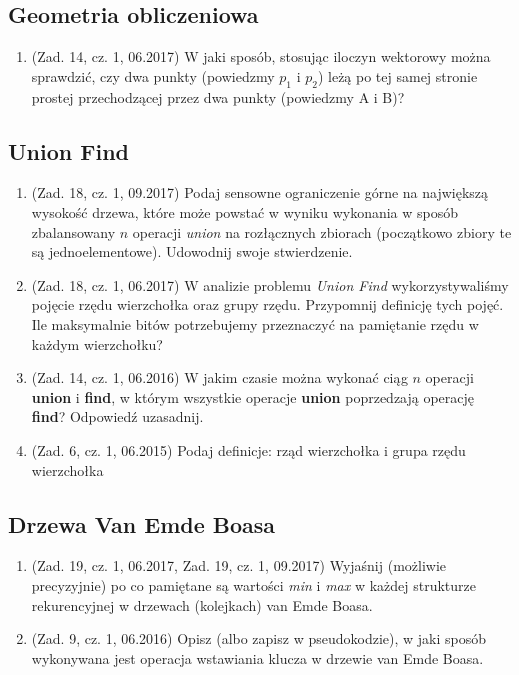 \documentclass[10pt]{article}%
\begin{document}
\subsection{Geometria obliczeniowa}

\begin{enumerate}

\item (Zad. 14, cz. 1, 06.2017) W jaki sposób, stosując iloczyn wektorowy można sprawdzić, czy dwa punkty (powiedzmy $p_1$ i $p_2$) leżą po tej samej stronie prostej przechodzącej przez dwa punkty (powiedzmy A i B)?

\end{enumerate}


\subsection{Union Find}

\begin{enumerate}

\item (Zad. 18, cz. 1, 09.2017) Podaj sensowne ograniczenie górne na największą wysokość drzewa, które może powstać w wyniku wykonania w sposób zbalansowany $n$ operacji \textit{union} na rozłącznych zbiorach (początkowo zbiory te są jednoelementowe). Udowodnij swoje stwierdzenie.

\item (Zad. 18, cz. 1, 06.2017) W analizie problemu \emph{Union Find} wykorzystywaliśmy pojęcie rzędu wierzchołka oraz grupy rzędu. Przypomnij definicję tych pojęć. Ile maksymalnie bitów potrzebujemy przeznaczyć na pamiętanie rzędu w każdym wierzchołku?

\item (Zad. 14, cz. 1, 06.2016) W jakim czasie można wykonać ciąg $n$ operacji \textbf{union} i \textbf{find}, w którym wszystkie operacje \textbf{union} poprzedzają operację \textbf{find}? Odpowiedź uzasadnij.

\item (Zad. 6, cz. 1, 06.2015) Podaj definicje: rząd wierzchołka i grupa rzędu wierzchołka

\end{enumerate}


\subsection{Drzewa Van Emde Boasa}

\begin{enumerate}

\item (Zad. 19, cz. 1, 06.2017, Zad. 19, cz. 1, 09.2017) Wyjaśnij (możliwie precyzyjnie) po co pamiętane są wartości \emph{min} i \emph{max} w każdej strukturze rekurencyjnej w drzewach (kolejkach) van Emde Boasa.

\item (Zad. 9, cz. 1, 06.2016) Opisz (albo zapisz w pseudokodzie), w jaki sposób wykonywana jest operacja wstawiania klucza w drzewie van Emde Boasa.

\end{enumerate}
\end{document}
